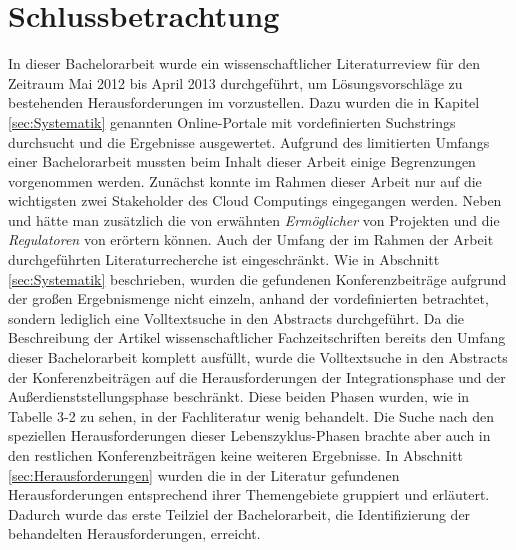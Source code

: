 \section{Schlussbetrachtung} 
\label{sec:Schluss}

In dieser Bachelorarbeit wurde ein wissenschaftlicher Literaturreview für den Zeitraum Mai 2012 bis April 2013 durchgeführt, um Lösungsvorschläge zu bestehenden Herausforderungen im \TCC vorzustellen.
Dazu wurden die in Kapitel \ref{sec:Systematik} genannten Online-Portale mit vordefinierten Suchstrings durchsucht und die Ergebnisse ausgewertet.
\newline
Aufgrund des limitierten Umfangs einer Bachelorarbeit mussten beim Inhalt dieser Arbeit einige Begrenzungen vorgenommen werden. 
Zunächst konnte im Rahmen dieser Arbeit nur auf die wichtigsten zwei Stakeholder des Cloud Computings eingegangen werden. Neben \CSUn und \CSPn hätte man zusätzlich die von \cite{Marston.2011} erwähnten \emph{Ermöglicher} von \CC Projekten und die \emph{Regulatoren} von \CSs erörtern können.
\newline
Auch der Umfang der im Rahmen der Arbeit durchgeführten Literaturrecherche ist eingeschränkt.
Wie in Abschnitt \ref{sec:Systematik} beschrieben, wurden die gefundenen Konferenzbeiträge aufgrund der großen Ergebnismenge nicht einzeln, anhand der vordefinierten \HiTCC betrachtet, sondern lediglich eine Volltextsuche in den Abstracts durchgeführt. 
Da die Beschreibung der Artikel wissenschaftlicher Fachzeitschriften bereits den Umfang dieser Bachelorarbeit komplett ausfüllt, wurde die Volltextsuche in den Abstracts der Konferenzbeiträgen auf die Herausforderungen der Integrationsphase und der Außerdienststellungsphase beschränkt.
Diese beiden Phasen wurden, wie in Tabelle 3-2 zu sehen, in der Fachliteratur wenig behandelt. 
Die Suche nach den speziellen Herausforderungen dieser Lebenszyklus-Phasen  brachte aber auch in den restlichen Konferenzbeiträgen keine weiteren Ergebnisse.
\newline
In Abschnitt \ref{sec:Herausforderungen} wurden die in der Literatur gefundenen Herausforderungen entsprechend ihrer Themengebiete gruppiert und erläutert.
Dadurch wurde das erste Teilziel der Bachelorarbeit, die Identifizierung der behandelten Herausforderungen, erreicht.
